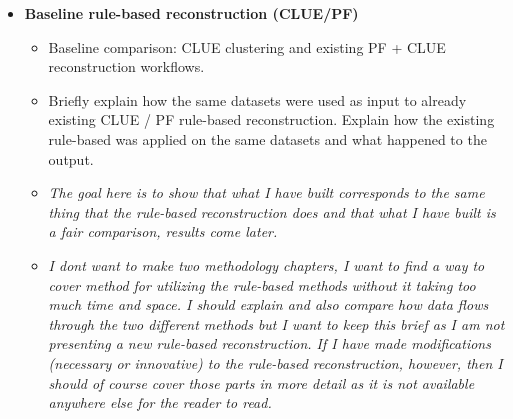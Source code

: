 \begin{itemize}
\item \textbf{Baseline rule-based reconstruction (CLUE/PF)}
\begin{itemize}
    \item Baseline comparison: CLUE clustering and existing PF + CLUE reconstruction workflows.
    \item Briefly explain how the same datasets were used as input to already existing CLUE / PF rule-based reconstruction. Explain how the existing rule-based was applied on the same datasets and what happened to the output. 
    \item \textit{The goal here is to show that what I have built corresponds to the same thing that the rule-based reconstruction does and that what I have built is a fair comparison, results come later.}
    \item \textit{I dont want to make two methodology chapters, I want to find a way to cover method for utilizing the rule-based methods without it taking too much time and space. I should explain and also compare how data flows through the two different methods but I want to keep this brief as I am not presenting a new rule-based reconstruction. If I have made modifications (necessary or innovative) to the rule-based reconstruction‚ however, then I should of course cover those parts in more detail as it is not available anywhere else for the reader to read.}
\end{itemize}

\end{itemize}